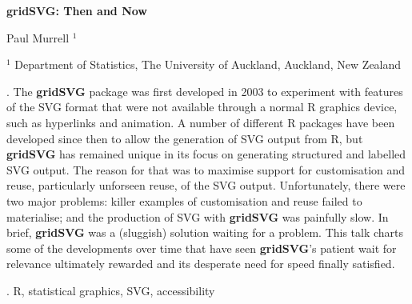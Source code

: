 \documentclass[12pt]{article}
\newcommand{\pkg}[1]{{\bf #1}}
\begin{document}
\begin{flushleft}


{\LARGE\bf gridSVG: Then and Now}

\vspace{.1in}
Paul Murrell $^1$
\begin{description}
\item $^1 $ Department of Statistics, The University of Auckland,
Auckland, New Zealand
\end{description}

\end{flushleft}



. 
The \pkg{gridSVG} package\cite{RJ-2014-013}
 was first developed in 2003 to experiment
with features of the SVG format
that were not available through a normal R graphics device\cite{R}, 
such as hyperlinks and animation.  A number of different 
R packages\cite{rsvgtipsdevice,cairo,svglite,svgannotation}
have been developed since then to allow the generation of SVG output from
R, but \pkg{gridSVG} has remained unique in its focus on generating 
structured and labelled SVG output.  The reason for that was to 
maximise support for
customisation and reuse, particularly unforseen reuse, of the SVG
output.  Unfortunately, there were two major problems:  killer examples of
customisation and reuse failed to materialise;  and the production of SVG with 
\pkg{gridSVG} was painfully slow.  In brief, \pkg{gridSVG} was
a (sluggish) solution waiting for a problem.  This talk charts some
of the developments over time that have seen \pkg{gridSVG}'s
patient wait for relevance ultimately rewarded and its 
desperate need for speed finally satisfied.

\vskip 2mm

.
R, statistical graphics, SVG, accessibility
\end{document}
